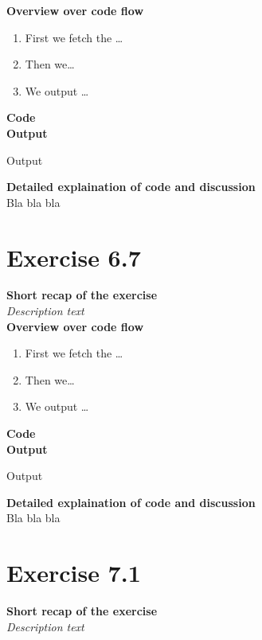 \documentclass{article}
\newcommand\pythonstyle{\lstset{
language=python,
breaklines=true,
basicstyle=\ttfamily\small,
otherkeywords={1, 2, 3, 4, 5, 6, 7, 8 ,9 , 0, -, =, +, [, ], (, ), \{, \}, :, *, !},             %
keywordstyle=\color{blue},
emph={class, pass, in, for, while, if, is, elif, else, not, and, or, OR
    def, print, exec, break, continue, return},
emphstyle=\color{black}\bfseries,
emph={[2]True, False, None, self},
emphstyle=[2]\color{purple},
emph={[3]from, import, as},
emphstyle=[3]\color{blue},
stringstyle=\color{red},
frame=tb,
showstringspaces=false,
morecomment=[s]{"""}{"""},
commentstyle=\color{gray},
rulesepcolor=\color{blue},
title=\lstname
}}
\newcommand\pythonexternal[2][]{{
\pythonstyle
}}
\begin{document}
\textbf{Overview over code flow}\\

\begin{enumerate}
  \item First we fetch the \ldots
  \item Then we\ldots
  \item We output \ldots\\
\end{enumerate}

\textbf{Code}\\
\textbf{Output}
\begin{pythonOutput}
Output
\end{pythonOutput}
\textbf{Detailed explaination of code and discussion}\\
Bla bla bla
\section{Exercise 6.7}
\textbf{Short recap of the exercise}\\
\textit{Description text}\\

\textbf{Overview over code flow}\\

\begin{enumerate}
  \item First we fetch the \ldots
  \item Then we\ldots
  \item We output \ldots\\
\end{enumerate}

\textbf{Code}\\
\textbf{Output}
\begin{pythonOutput}
Output
\end{pythonOutput}
\textbf{Detailed explaination of code and discussion}\\
Bla bla bla


\section{Exercise 7.1}
\textbf{Short recap of the exercise}\\
\textit{Description text}\\
\end{document}
